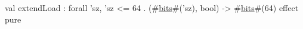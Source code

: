val extendLoad : forall 'sz, 'sz <= 64 .  (#\hyperref[zbits]{bits}#('sz), bool) -> #\hyperref[zbits]{bits}#(64) effect pure
